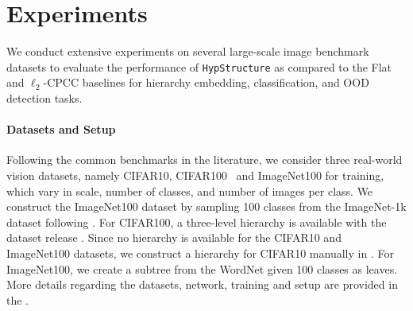 \section{Experiments}

We conduct extensive experiments on several large-scale image benchmark datasets to evaluate the performance of \texttt{HypStructure} as compared to the Flat and $\ell_2$-CPCC baselines for hierarchy embedding, classification, and OOD detection tasks. 


\label{sec:experiments}
\paragraph{Datasets and Setup}
Following the common benchmarks in the literature, we consider three real-world vision datasets, namely CIFAR10, CIFAR100~\citep{krizhevsky2009learning} and ImageNet100 \citep{ming2022delving} for training, which vary in scale, number of classes, and number of images per class. We construct the ImageNet100 dataset by sampling 100 classes from the ImageNet-1k \citep{imagenet} dataset following \citep{ming2022delving}. For CIFAR100, a three-level hierarchy is available with the dataset release \citep{krizhevsky2009learning}. Since no hierarchy is available for the CIFAR10 and ImageNet100 datasets, we construct a hierarchy for CIFAR10 manually in . For ImageNet100, we create a subtree from the WordNet \citep{wordnet}  given 100 classes as leaves. More details regarding the datasets, network, training and setup are provided in the .


